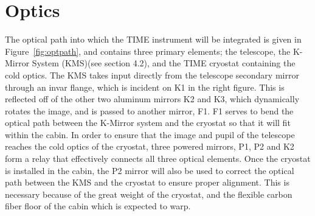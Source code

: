 \documentclass[manuscript]{aastex}
\begin{document}
\section{\textbf{Optics}}

The optical path into which the TIME instrument will be integrated is given in Figure~\ref{fig:optpath}, and contains three primary elements; the telescope, the K-Mirror System (KMS)(see section 4.2), and the TIME cryostat containing the cold optics. The KMS takes input directly from the telescope secondary mirror through an invar flange, which is incident on K1 in the right figure. This is reflected off of the other two aluminum mirrors K2 and K3, which dynamically rotates the image, and is passed to another mirror, F1. F1 serves to bend the optical path between the K-Mirror system and the cryostat so that it will fit within the cabin. In order to ensure that the image and pupil of the telescope reaches the cold optics of the cryostat, three powered mirrors, P1, P2 and K2 form a relay that effectively connects all three optical elements. Once the cryostat is installed in the cabin, the P2 mirror will also be used to correct the optical path between the KMS and the cryostat to ensure proper alignment. This is necessary because of the great weight of the cryostat, and the flexible carbon fiber floor of the cabin which is expected to warp.
\end{document}
